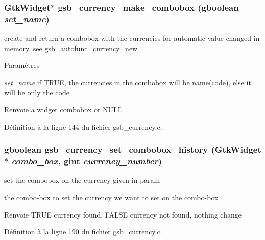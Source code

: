 \subsubsection[{gsb\_\-currency\_\-make\_\-combobox}]{\setlength{\rightskip}{0pt plus 5cm}GtkWidget$\ast$ gsb\_\-currency\_\-make\_\-combobox (gboolean {\em set\_\-name})}\label{gsb__currency_8h_ad0c6f15f859f45a94923fa743d81f5b5}
create and return a combobox with the currencies for automatic value changed in memory, see gsb\_\-autofunc\_\-currency\_\-new


\begin{DoxyParams}{Paramètres}
\item[{\em set\_\-name}]if TRUE, the currencies in the combobox will be name(code), else it will be only the code\end{DoxyParams}
\begin{DoxyReturn}{Renvoie}
a widget combobox or NULL 
\end{DoxyReturn}


Définition à la ligne 144 du fichier gsb\_\-currency.c.

\subsubsection[{gsb\_\-currency\_\-set\_\-combobox\_\-history}]{\setlength{\rightskip}{0pt plus 5cm}gboolean gsb\_\-currency\_\-set\_\-combobox\_\-history (GtkWidget $\ast$ {\em combo\_\-box}, \/  gint {\em currency\_\-number})}\label{gsb__currency_8h_a8774e282bad3c3101b161fd54bcb660a}
set the combobox on the currency given in param

the combo-\/box to set  the currency we want to set on the combo-\/box

\begin{DoxyReturn}{Renvoie}
TRUE currency found, FALSE currency not found, nothing change 
\end{DoxyReturn}


Définition à la ligne 190 du fichier gsb\_\-currency.c.

